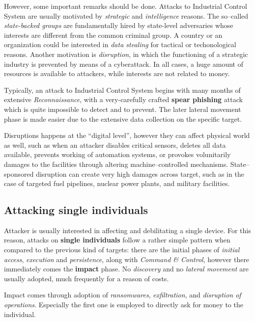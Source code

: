 \documentclass[10pt]{extbook}
\begin{document}
However, some important remarks should be done. Attacks to Industrial Control
System are usually motivated by \emph{strategic} and \emph{intelligence}
reasons. The so--called \emph{state\--backed groups} are fundamentally hired
by state\--level adversaries whose interests are different from the common
criminal group. A country or an organization could be interested in \emph{data
stealing} for tactical or techonological reasons. Another motivation is
\emph{disruption}, in which the functioning of a strategic industry is
prevented by means of a cyberattack. In all cases, a huge amount of resources
is available to attackers, while interests are not related to money.

Typically, an attack to Industrial Control System begins with many months of
extensive \emph{Reconnaissance}, with a very\--carefully crafted \textbf{spear
phishing} attack which is quite impossible to detect and to prevent. The later
lateral movement phase is made easier due to the extensive data collection on
the specific target.

Disruptions happens at the ``digital level'', however they can affect physical
world as well, such as when an attacker disables critical sensors, deletes all
data available, prevents working of automation systems, or provokes
volunitarily damages to the facilities through altering machine--controlled
mechanisms. State--sponsored disruption can create very high damages across
target, such as in the case of targeted fuel pipelines, nuclear power plants,
and military facilities.


\subsection{Attacking single individuals}

Attacker is usually interested in affecting and debilitating a single device.
For this reason, attacks on \textbf{single individuals} follow a rather simple
pattern when compared to the previous kind of targets: there are the initial
phases of \emph{initial access}, \emph{execution} and \emph{persistence}, along
with \emph{Command \& Control}, however there immediately comes the
\textbf{impact} phase. No \emph{discovery} and no \emph{lateral movement} are
usually adopted, much frequently for a reason of costs.

Impact comes through adoption of \emph{ransomwares}, \emph{exfiltration}, and
\emph{disruption of operations}. Especially the first one is employed to
directly ask for money to the individual.
\end{document}
